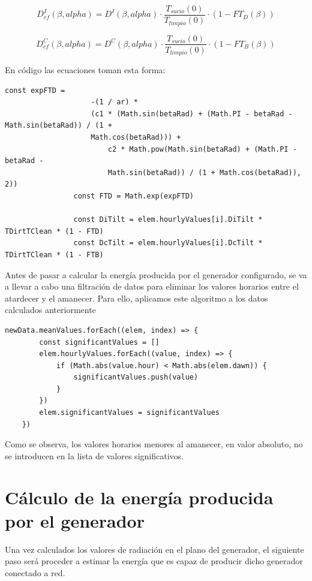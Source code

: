 \begin{equation}
D_{ef}^I(\beta, alpha) = D^I(\beta, alpha) \cdot \frac{T_{sucio}(0)}{T_{limpio}(0)} \cdot (1-FT_D(\beta))
\end{equation}

\begin{equation}
D_{ef}^C(\beta, alpha) = D^C(\beta, alpha) \cdot \frac{T_{sucio}(0)}{T_{limpio}(0)} \cdot (1-FT_B(\beta))
\end{equation}

En código las ecuaciones toman esta forma:
\begin{lstlisting}[style=ES6, caption={Cálculo de las componentes efectivas}]
				const expFTD =
					-(1 / ar) *
					(c1 * (Math.sin(betaRad) + (Math.PI - betaRad - Math.sin(betaRad)) / (1 + 
					Math.cos(betaRad))) +
						c2 * Math.pow(Math.sin(betaRad) + (Math.PI - betaRad - 
						Math.sin(betaRad)) / (1 + Math.cos(betaRad)), 2))
				const FTD = Math.exp(expFTD)

				const DiTilt = elem.hourlyValues[i].DiTilt * TDirtTClean * (1 - FTD)
				const DcTilt = elem.hourlyValues[i].DcTilt * TDirtTClean * (1 - FTB)
\end{lstlisting}

Antes de pasar a calcular la energía producida por el generador configurado, se va a llevar a cabo una filtración de datos para eliminar los valores horarios entre el atardecer y el amanecer.
Para ello, aplicamos este algoritmo a los datos calculados anteriormente
\begin{lstlisting}[style=ES6, caption={Selección de los valores clave}]
	newData.meanValues.forEach((elem, index) => {
		const significantValues = []
		elem.hourlyValues.forEach((value, index) => {
			if (Math.abs(value.hour) < Math.abs(elem.dawn)) {
				significantValues.push(value)
			}
		})
		elem.significantValues = significantValues
	})
\end{lstlisting}
Como se observa, los valores horarios menores al amanecer, en valor absoluto, no se introducen en la lista de valores significativos.
\newpage

\section{Cálculo de la energía producida por el generador}

Una vez calculados los valores de radiación en el plano del generador, el siguiente paso será proceder a estimar la energía que es capaz de producir dicho generador conectado a red.\\

